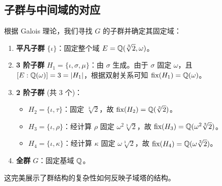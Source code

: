 \documentclass[11pt]{article}
\begin{document}
\subsection{子群与中间域的对应}
根据 Galois 理论，我们寻找 $G$ 的子群并确定其固定域：
\begin{enumerate}
    \item \textbf{平凡子群} $\{ \iota \}$：固定整个域 $E = \mathbb{Q}(\sqrt[3]{2}, \omega)$。
    \item \textbf{3 阶子群} $H_1 = \{ \iota, \sigma, \mu \}$：由 $\sigma$ 生成。由于 $\sigma$ 固定 $\omega$，且 $[E : \mathbb{Q}(\omega)] = 3 = |H_1|$，根据双射关系可知 $\text{fix}(H_1) = \mathbb{Q}(\omega)$。
    \item \textbf{2 阶子群} (共 3 个)：
    \begin{itemize}
        \item $H_2 = \{ \iota, \tau \}$：固定 $\sqrt[3]{2}$，故 $\text{fix}(H_2) = \mathbb{Q}(\sqrt[3]{2})$。
        \item $H_3 = \{ \iota, \rho \}$：经计算 $\rho$ 固定 $\omega^2 \sqrt[3]{2}$，故 $\text{fix}(H_3) = \mathbb{Q}(\omega^2 \sqrt[3]{2})$。
        \item $H_4 = \{ \iota, \kappa \}$：经计算 $\kappa$ 固定 $\omega \sqrt[3]{2}$，故 $\text{fix}(H_4) = \mathbb{Q}(\omega \sqrt[3]{2})$。
    \end{itemize}
    \item \textbf{全群} $G$：固定基域 $\mathbb{Q}$。
\end{enumerate}

这完美展示了群结构的复杂性如何反映子域塔的结构。
\end{document}
